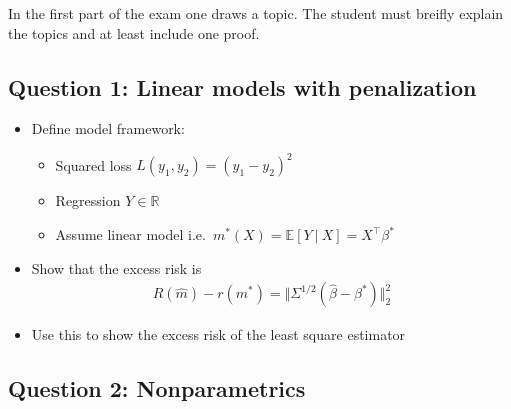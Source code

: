 \documentclass[a4paper,12pt,openany]{book}
\providecommand{\tightlist}{%
 \setlength{\itemsep}{0pt}\setlength{\parskip}{0pt}}
\begin{document}
In the first part of the exam one draws a topic. The student must breifly explain the topics and at least include one proof.

\hypertarget{question-1-linear-models-with-penalization}{%
\subsection{Question 1: Linear models with penalization}\label{question-1-linear-models-with-penalization}}

\begin{itemize}
\tightlist
\item
  Define model framework:

  \begin{itemize}
  \tightlist
  \item
    Squared loss \(L(y_1,y_2)=(y_1-y_2)^2\)
  \item
    Regression \(Y\in \mathbb R\)
  \item
    Assume linear model i.e.~\(m^*(X)=\mathbb E[Y\ \vert\ X]=X^\top \beta^*\)
  \end{itemize}
\item
  Show that the excess risk is
  \begin{align*}
    R(\hat m)-r(m^*)=\Vert \Sigma^{1/2}(\hat\beta - \beta^*)\Vert_2^2
    \end{align*}
\item
  Use this to show the excess risk of the least square estimator
\end{itemize}

\hypertarget{question-2-nonparametrics}{%
\subsection{Question 2: Nonparametrics}\label{question-2-nonparametrics}}
\end{document}
